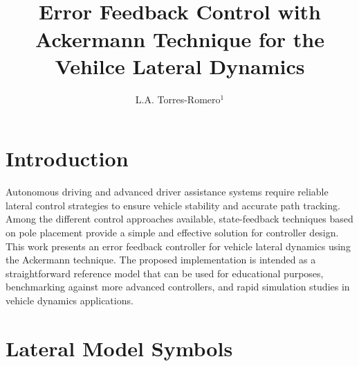 \documentclass[12pt,a4paper]{cibb}
\title{\Large $\ $\\ \bf Error Feedback Control with Ackermann Technique for the Vehilce Lateral Dynamics}
\author{\large L.A. Torres-Romero$^1$}
\begin{document}
\renewcommand{\thefootnote}{}


\thispagestyle{myheadings}
\pagestyle{myheadings}


\section{Introduction} \label{sec:Introduction}

Autonomous driving and advanced driver assistance systems require reliable lateral control strategies to ensure vehicle stability and accurate path tracking. Among the different control approaches available, state-feedback techniques based on pole placement provide a simple and effective solution for controller design. This work presents an error feedback controller for vehicle lateral dynamics using the Ackermann technique. The proposed implementation is intended as a straightforward reference model that can be used for educational purposes, benchmarking against more advanced controllers, and rapid simulation studies in vehicle dynamics applications.

\section{Lateral Model Symbols} \label{sec:Symbols}
\end{document}
